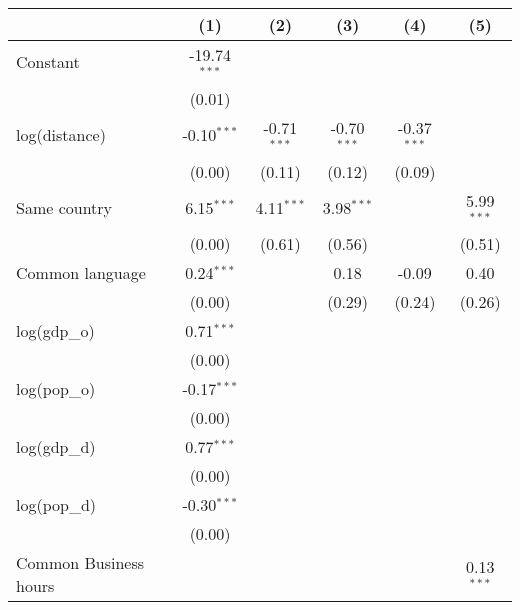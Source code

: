 
\begingroup
\centering
\small
\begin{tabular}{lccccc}
   \toprule
                            & (1)            & (2)           & (3)           & (4)           & (5)\\  
   \midrule 
   Constant                 & -19.74$^{***}$ &               &               &               &   \\   
                            & (0.01)         &               &               &               &   \\   
   log(distance)            & -0.10$^{***}$  & -0.71$^{***}$ & -0.70$^{***}$ & -0.37$^{***}$ &   \\   
                            & (0.00)         & (0.11)        & (0.12)        & (0.09)        &   \\   
   Same country             & 6.15$^{***}$   & 4.11$^{***}$  & 3.98$^{***}$  &               & 5.99$^{***}$\\   
                            & (0.00)         & (0.61)        & (0.56)        &               & (0.51)\\   
   Common language          & 0.24$^{***}$   &               & 0.18          & -0.09         & 0.40\\   
                            & (0.00)         &               & (0.29)        & (0.24)        & (0.26)\\   
   log(gdp\_o)              & 0.71$^{***}$   &               &               &               &   \\   
                            & (0.00)         &               &               &               &   \\   
   log(pop\_o)              & -0.17$^{***}$  &               &               &               &   \\   
                            & (0.00)         &               &               &               &   \\   
   log(gdp\_d)              & 0.77$^{***}$   &               &               &               &   \\   
                            & (0.00)         &               &               &               &   \\   
   log(pop\_d)              & -0.30$^{***}$  &               &               &               &   \\   
                            & (0.00)         &               &               &               &   \\   
   Common Business hours    &                &               &               &               & 0.13$^{***}$\\   

\end{tabular}
